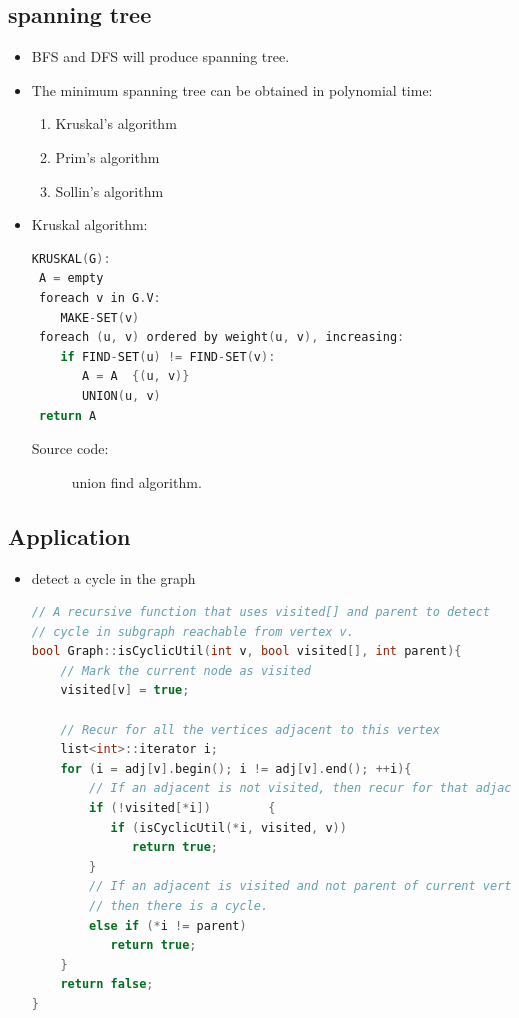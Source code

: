 \documentclass[a4paper,11pt,twoside]{book}
\begin{document}
\subsection{spanning tree}
\begin{itemize}
\item 	BFS and DFS will produce spanning tree. 
\item The minimum spanning tree can be obtained in polynomial time:
\begin{enumerate}
\item Kruskal's algorithm
\item Prim's algorithm
\item Sollin's algorithm
\end{enumerate}

\item Kruskal algorithm:
\begin{lstlisting}[frame=single, language=c++]
KRUSKAL(G):
 A = empty
 foreach v in G.V:
    MAKE-SET(v)
 foreach (u, v) ordered by weight(u, v), increasing:
    if FIND-SET(u) != FIND-SET(v):
       A = A  {(u, v)}
       UNION(u, v)
 return A
\end{lstlisting}
\begin{description}
	\item[Source code:] union find algorithm.
\end{description}

\end{itemize}


\subsection{Application}
\begin{itemize}
\item detect a cycle in the graph
\begin{lstlisting}[frame=single, language=c++]
// A recursive function that uses visited[] and parent to detect
// cycle in subgraph reachable from vertex v.
bool Graph::isCyclicUtil(int v, bool visited[], int parent){
    // Mark the current node as visited
    visited[v] = true;
 
    // Recur for all the vertices adjacent to this vertex
    list<int>::iterator i;
    for (i = adj[v].begin(); i != adj[v].end(); ++i){
        // If an adjacent is not visited, then recur for that adjacent
        if (!visited[*i])        {
           if (isCyclicUtil(*i, visited, v))
              return true;
        }
        // If an adjacent is visited and not parent of current vertex,
        // then there is a cycle.
        else if (*i != parent)
           return true;
    }
    return false;
}
\end{lstlisting}

\end{itemize}
\end{document}
